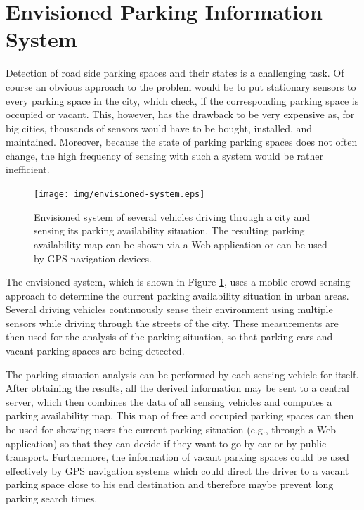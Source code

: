 \section{Envisioned Parking Information System}

Detection of road side parking spaces and their states is a challenging task. Of course an obvious approach to the problem would be to put stationary sensors to every parking space in the city, which check, if the corresponding parking space is occupied or vacant. This, however, has the drawback to be very expensive as, for big cities, thousands of sensors would have to be bought, installed, and maintained. Moreover, because the state of parking parking spaces does not often change, the high frequency of sensing with such a system would be rather inefficient.

\begin{figure}
	\centering
	\texttt{[image: img/envisioned-system.eps]}
	\caption{Envisioned system of several vehicles driving through a city and sensing its parking availability situation. The resulting parking availability map can be shown via a Web application or can be used by GPS navigation devices.}
	\label{fig:envisioned_system}
\end{figure}

The envisioned system, which is shown in Figure \ref{fig:envisioned_system}, uses a mobile crowd sensing approach to determine the current parking availability situation in urban areas. Several driving vehicles continuously sense their environment using multiple sensors while driving through the streets of the city. These measurements are then used for the analysis of the parking situation, so that parking cars and vacant parking spaces are being detected. 

The parking situation analysis can be performed by each sensing vehicle for itself. After obtaining the results, all the derived information may be sent to a central server, which then combines the data of all sensing vehicles and computes a parking availability map. This map of free and occupied parking spaces can then be used for showing users the current parking situation (e.g., through a Web application) so that they can decide if they want to go by car or by public transport. Furthermore, the information of vacant parking spaces could be used effectively by GPS navigation systems which could direct the driver to a vacant parking space close to his end destination and therefore maybe prevent long parking search times.








